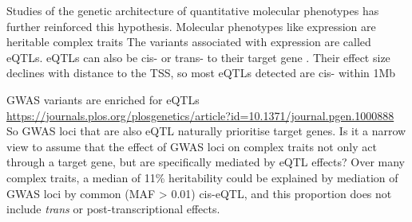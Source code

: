 \begin{outline}
\1 Studies of the genetic architecture of quantitative molecular phenotypes has further reinforced this hypothesis.
    \2 Molecular phenotypes like expression are heritable complex traits \autocite{gaffney2013GlobalPropertiesFunctional}
    \2 The variants associated with expression are called \glspl{eQTL}.
    \2 eQTLs can also be cis- or trans- to their target gene \autocite{albert2015RoleRegulatoryVariation}.
    \2 Their effect size declines with distance to the TSS, so most eQTLs detected are cis- within 1Mb \autocite{vandiedonck2017GeneticAssociationMolecular}

\1 GWAS variants are enriched for eQTLs \url{https://journals.plos.org/plosgenetics/article?id=10.1371/journal.pgen.1000888}
    \2 So GWAS loci that are also eQTL naturally prioritise target genes.
    \2 Is it a narrow view to assume that the effect of GWAS loci on complex traits not only act through a target gene, but are specifically mediated by eQTL effects?
    \2 Over many complex traits, a median of 11\% heritability could be explained by mediation of GWAS loci by common (MAF > 0.01) cis-eQTL, 
    and this proportion does not include \textit{trans} or post-transcriptional effects.


\end{outline}
